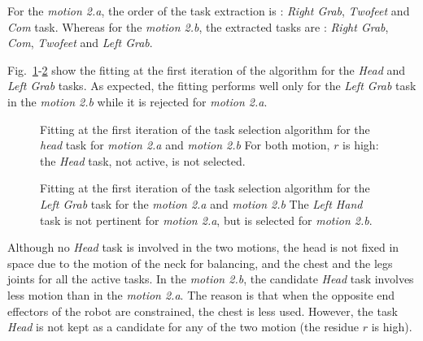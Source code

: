 \documentclass[letterpaper, 10pt, conference]{ieeeconf}      %
\begin{document}
For the \emph{motion 2.a}, the order of the task extraction is :
\emph{Right Grab}, \emph{Twofeet} and \emph{Com} task.
Whereas for the \emph{motion 2.b},
the extracted tasks are : \emph{Right Grab},  \emph{Com}, \emph{Twofeet} and \emph{Left Grab}.

Fig.~\ref{fig:exp1:headFit}-\ref{fig:exp1:taskLhand} show the
fitting at the first iteration of the algorithm for the \emph{Head} and \emph{Left Grab} tasks. As expected,
the fitting performs well only for the \emph{Left Grab} task in the \emph{motion 2.b} while it is rejected for
\emph{motion 2.a}.
\begin{figure}[t]
  \centering
  \subfigure[Motion 2.a]{
  \resizebox{.48\textwidth}{!} {
  
  }
  \label{fig:exp1:headFit:R}
  }
  \subfigure[Motion 2.b]{
  \resizebox{.48\textwidth}{!} {
  
  }
  \label{fig:exp1:headFit:RL}
  }
  \caption{Fitting at the first iteration of the task selection algorithm
  for the \emph{head} task for \emph{motion 2.a} and \emph{motion 2.b} 
  For both motion, $r$ is high: the \emph{Head} task, not active, is not selected.}
  \label{fig:exp1:headFit}
\end{figure}
\begin{figure}[t]
  \centering
  \subfigure[Motion 2.a]{
  \resizebox{.48\textwidth}{!} {
  
  }                           
  \label{fig:exp1:taskLhand:R}
  }
  \subfigure[Motion 2.b]{
  \resizebox{.48\textwidth}{!} {
  
  }
  \label{fig:exp1:taskLhand:RL}
  }
  \caption{Fitting at the first iteration of the task selection algorithm
  for the \emph{Left Grab} task for the \emph{motion 2.a} and \emph{motion 2.b} 
  The \emph{Left Hand} task is not pertinent for \emph{motion 2.a}, but is selected for \emph{motion 2.b}.}
  \label{fig:exp1:taskLhand}
\end{figure}

Although no \emph{Head} task is involved in the two motions, the head is not 
fixed in space due to the motion of the neck for balancing, and the chest and the legs
joints for all the active tasks.
In the \emph{motion 2.b}, the candidate \emph{Head} task involves less motion
than in the \emph{motion 2.a}. The reason is that when the opposite end effectors
of the robot are constrained, the chest is less used.
However, the task \emph{Head} is not kept as a candidate for any of the two motion (the residue $r$ is high).
\end{document}
